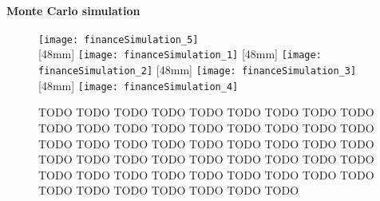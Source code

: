 \paragraph{Monte Carlo simulation}

\cite{Mueller15Ansaetze}
\cite{Sharpe66Mutual}

% 
% 
% 
% 


\begin{figure}
  \texttt{[image: financeSimulation\_5]}%
  \\[2mm]%
  [48mm]{%
    \texttt{[image: financeSimulation\_1]}%
  }%
  \hfill%
  [48mm]{%
    \texttt{[image: financeSimulation\_2]}%
  }%
  \hfill%
  [48mm]{%
    \texttt{[image: financeSimulation\_3]}%
  }%
  \\[2mm]%
  [48mm]{%
    \texttt{[image: financeSimulation\_4]}%
  }%
  \hfill%
  \begin{minipage}[b]{92mm}%
    \caption[TODO]{%
      TODO TODO TODO TODO TODO TODO TODO TODO TODO TODO TODO TODO TODO
      TODO TODO TODO TODO TODO TODO TODO TODO TODO TODO TODO TODO TODO
      TODO TODO TODO TODO TODO TODO TODO TODO TODO TODO TODO TODO TODO
      TODO TODO TODO TODO TODO TODO TODO TODO TODO TODO TODO TODO TODO%
    }%
    \vspace*{-6.3mm}%
    \label{fig:financeSimulation}%
  \end{minipage}%
\end{figure}

